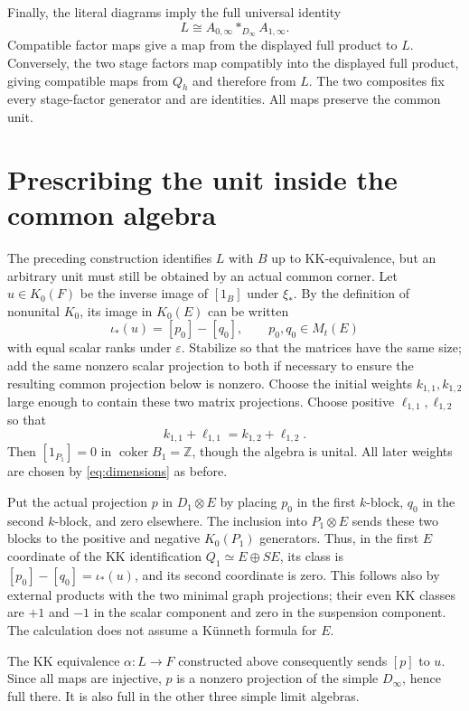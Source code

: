\documentclass[11pt,letterpaper]{amsart}
\theoremstyle{remark}\newtheorem{remark}[theorem]{Remark}
\newcommand{\Z}{\mathbb Z}\newcommand{\C}{\mathbb C}
\newcommand{\coker}{\operatorname{coker}}\newcommand{\rank}{\operatorname{rank}}
\begin{document}
Finally, the literal diagrams imply the full universal identity
\begin{equation}\label{eq:fulllimit}
             L\cong A_{0,\infty}*_{D_\infty}A_{1,\infty}.
\end{equation}
Compatible factor maps give a map from the displayed full product to
$L$. Conversely, the two stage factors map compatibly into the displayed
full product, giving compatible maps from $Q_h$ and therefore from $L$.
The two composites fix every stage-factor generator and are identities.
All maps preserve the common unit.

\section{Prescribing the unit inside the common algebra}
The preceding construction identifies $L$ with $B$ up to KK-equivalence,
but an arbitrary unit must still be obtained by an actual common corner.
Let $u\in K_0(F)$ be the inverse image of $[1_B]$ under $\xi_*$.
By the definition of nonunital $K_0$, its image in $K_0(E)$ can be written
\[
                  \iota_*(u)=[p_0]-[q_0],\qquad p_0,q_0\in M_t(E)
\]
with equal scalar ranks under $\varepsilon$. Stabilize so that the
matrices have the same size; add the same nonzero scalar projection to
both if necessary to ensure the resulting common projection below is
nonzero. Choose the initial weights $k_{1,1},k_{1,2}$ large enough to
contain these two matrix projections. Choose positive $\ell_{1,1},\ell_{1,2}$
so that
\[
                   k_{1,1}+\ell_{1,1}=k_{1,2}+\ell_{1,2}.
\]
Then $[1_{P_1}]=0$ in $\coker B_1=\Z$, though the algebra is unital.
All later weights are chosen by \eqref{eq:dimensions} as before.

Put the actual projection $p$ in $D_1\otimes E$ by placing $p_0$ in the
first $k$-block, $q_0$ in the second $k$-block, and zero elsewhere.
The inclusion into $P_1\otimes E$ sends these two blocks to the positive
and negative $K_0(P_1)$ generators. Thus, in the first $E$ coordinate
of the KK identification $Q_1\simeq E\oplus SE$, its class is
$[p_0]-[q_0]=\iota_*(u)$, and its second coordinate is zero. This follows
also by external products with the two minimal graph projections; their
even KK classes are $+1$ and $-1$ in the scalar component and zero in
the suspension component. The calculation does not assume a K\"unneth
formula for $E$.

The KK equivalence $\alpha:L\to F$ constructed above consequently sends
$[p]$ to $u$. Since all maps are injective, $p$ is a nonzero projection
of the simple $D_\infty$, hence full there. It is also full in the other
three simple limit algebras.
\end{document}
